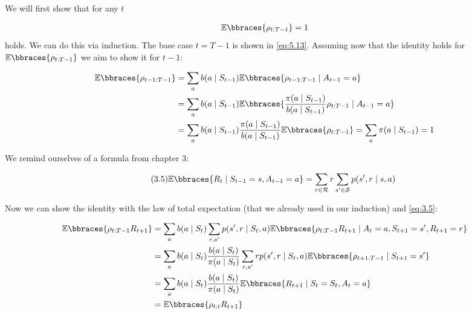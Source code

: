 \begin{solution}

We will first show that for any $t$

\begin{align*}
  \mathbb{E}\bbraces{\rho_{t:T-1}} = 1
\end{align*}
holds. We can do this via induction. The base case $t = T-1$ is shown in \eqref{eq:5.13}. Assuming now that the identity holds for $\mathbb{E}\bbraces{\rho_{t:T-1}}$ we aim to show it for $t-1$:

\begin{align*}
  \mathbb{E}\bbraces{\rho_{t-1:T-1}}
  &=
  \sum_a b(a \mid S_{t-1}) \mathbb{E}\bbraces{\rho_{t-1:T-1}\mid A_{t-1} = a} \\
  &=
  \sum_a b(a \mid S_{t-1}) \mathbb{E}\bbraces{\frac{\pi(a\mid S_{t-1})}{b(a \mid S_{t-1})}\rho_{t:T-1}\mid A_{t-1} = a}\\
  &=
  \sum_a b(a \mid S_{t-1}) \frac{\pi(a\mid S_{t-1})}{b(a \mid S_{t-1})} \mathbb{E}\bbraces{\rho_{t:T-1}}
  =
  \sum_a \pi(a\mid S_{t-1})
  = 1
\end{align*}

We remind ourselves of a formula from chapter 3:

\begin{align*} \label{eq:3.5} \tag{3.5}
  \mathbb{E}\bbraces{R_t\mid S_{t-1} = s, A_{t-1} = a}
  =
  \sum_{r \in \mathcal R} r \sum_{s^\prime \in \mathcal S} p(s^\prime,r\mid s,a)
\end{align*}

Now we can show the identity with the law of total expectation (that we already used in our induction) and \eqref{eq:3.5}:

\begin{align*}
  \mathbb{E}\bbraces{\rho_{t:T-1}R_{t+1}}
  &=
  \sum_a b(a\mid S_t) \sum_{r,s^\prime} p(s^\prime,r\mid S_t,a)
  \mathbb{E}\bbraces{\rho_{t:T-1}R_{t+1}\mid A_t = a, S_{t+1} = s^\prime, R_{t+1} = r} \\
  &=
  \sum_a b(a\mid S_t) \frac{b(a \mid S_t)}{\pi(a \mid S_t)}\sum_{r,s^\prime} r p(s^\prime,r\mid S_t,a)
  \mathbb{E}\bbraces{\rho_{t+1:T-1}\mid S_{t+1} = s^\prime} \\
  &= \sum_a  b(a\mid S_t) \frac{b(a \mid S_t)}{\pi(a \mid S_t)} \mathbb{E}\bbraces{R_{t+1}\mid S_t = S_t, A_t = a} \\
  &=
  \mathbb{E}\bbraces{\rho_{t:t}R_{t+1}}
\end{align*}
\end{solution}

